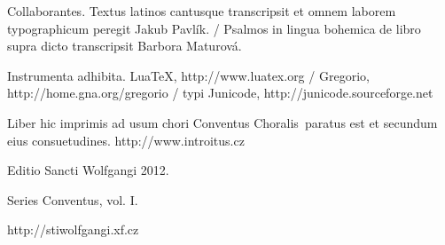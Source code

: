 \documentclass[a4paper, twoside, 12pt]{article}
\begin{document}
Collaborantes.
Textus latinos cantusque transcripsit et omnem laborem typographicum peregit
Jakub Pavlík. /
Psalmos in lingua bohemica de libro supra dicto transcripsit
Barbora Maturová.

Instrumenta adhibita.
LuaTeX, http://www.luatex.org / 
Gregorio, http://home.gna.org/gregorio /
typi Junicode, http://junicode.sourceforge.net

\begin{center}
Liber hic imprimis ad usum chori 
\guillemotright Conventus Choralis\guillemotleft\ 
paratus est
et secundum eius consuetudines.
http://www.introitus.cz

\vspace{1cm}

{\large Editio Sancti Wolfgangi 2012.}

\vspace{2mm}

Series \guillemotright Conventus\guillemotleft, vol. I.

\vspace{1cm}

http://stiwolfgangi.xf.cz

\end{center}

\vfill
\end{document}
